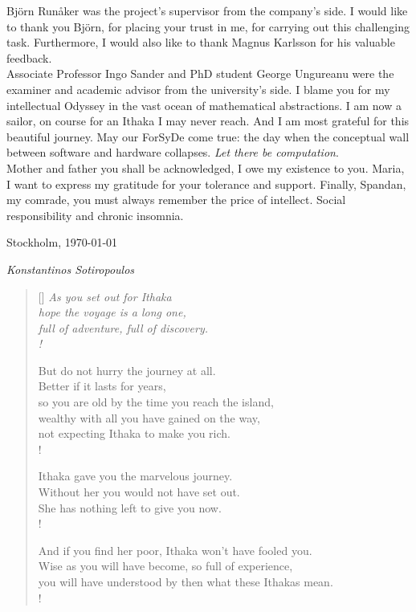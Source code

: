 \documentclass[11pt]{article}
\newcommand{\attrib}[1]{\nopagebreak{\raggedcenter \footnotesize #1\par}}
\begin{document}
Björn Runåker was the project's supervisor from the company's side.
I would like to thank you Björn, for placing your trust in me, for carrying out this challenging task.
Furthermore, I would also like to thank Magnus Karlsson for his valuable feedback.\\

Associate Professor Ingo Sander and PhD student George Ungureanu were the examiner and academic advisor from the university's side. 
I blame you for my intellectual Odyssey in the vast ocean of mathematical abstractions.
I am now a sailor, on course for an Ithaka I may never reach.
And I am most grateful for this beautiful journey.
May our ForSyDe come true: the day when the conceptual wall between software and hardware collapses.
\textit{Let there be computation}.\\

Mother and father you shall be acknowledged, I owe my existence to you.
Maria, I want to express my gratitude for your tolerance and support.
Finally, Spandan, my comrade, you must always remember the price of intellect.
Social responsibility and chronic insomnia.

\vspace{1.0cm}

\noindent
Stockholm, \today

\textit{Konstantinos Sotiropoulos}
\clearpage

\begin{LATEX}
\begin{verse}[\linewidth]
\itshape  As you set out for Ithaka \\
          hope the voyage is a long one, \\
          full of adventure, full of discovery. \\!

          But do not hurry the journey at all. \\
          Better if it lasts for years, \\
          so you are old by the time you reach the island, \\
          wealthy with all you have gained on the way, \\
          not expecting Ithaka to make you rich. \\!

          Ithaka gave you the marvelous journey. \\
          Without her you would not have set out. \\
          She has nothing left to give you now. \\!
 
          And if you find her poor, Ithaka won’t have fooled you. \\
          Wise as you will have become, so full of experience, \\
          you will have understood by then what these Ithakas mean. \\!
	  
	  \attrib{ Konstantinos Kavafis, Ithaka }
\end{verse}
\clearpage
\end{LATEX}
\end{document}
